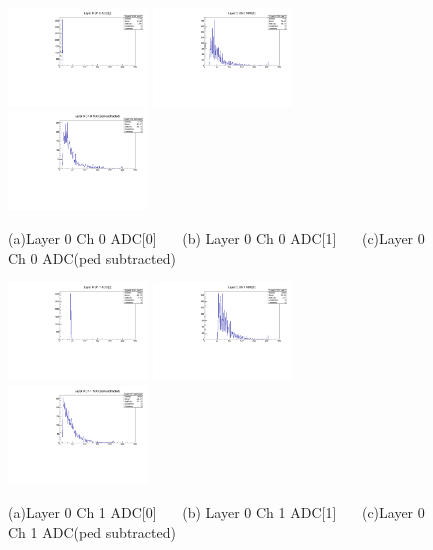 \documentclass[a4paper,11pt]{article}
\theoremstyle{mytheor}
\begin{document}
\begin{figure}[H] 
\vspace*{-0.3cm} 
\includegraphics[width=0.33\textwidth,scale=0.5,trim=0 0 0 0,clip]{plotsdir/file0_muons-Layer0_Ch0_adc0-1.pdf} 
\includegraphics[width=0.33\textwidth,scale=0.5,trim=0 0 0 0,clip]{plotsdir/file0_muons-Layer0_Ch0_adc1-1.pdf} 
\includegraphics[width=0.33\textwidth,scale=0.5,trim=0 0 0 0,clip]{plotsdir/file0_muons-Layer0_Ch0_adcPedsub-1.pdf} 
\caption{(a)Layer 0 Ch 0 ADC[0] ~~~(b) Layer 0 Ch 0 ADC[1] ~~~(c)Layer 0 Ch 0 ADC(ped subtracted) } 
\end{figure} 
\begin{figure}[H] 
\vspace*{-0.3cm} 
\includegraphics[width=0.33\textwidth,scale=0.5,trim=0 0 0 0,clip]{plotsdir/file0_muons-Layer0_Ch1_adc0-1.pdf} 
\includegraphics[width=0.33\textwidth,scale=0.5,trim=0 0 0 0,clip]{plotsdir/file0_muons-Layer0_Ch1_adc1-1.pdf} 
\includegraphics[width=0.33\textwidth,scale=0.5,trim=0 0 0 0,clip]{plotsdir/file0_muons-Layer0_Ch1_adcPedsub-1.pdf} 
\caption{(a)Layer 0 Ch 1 ADC[0] ~~~(b) Layer 0 Ch 1 ADC[1] ~~~(c)Layer 0 Ch 1 ADC(ped subtracted) } 
\end{figure} 
\end{document}
